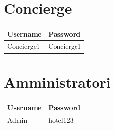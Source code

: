 \documentclass [a4paper, 12pt]{book}
\begin{document}
\section{Concierge}
\begin{table}[h]
\centering
\begin{tabular}{|l|l|}
\hline
\textbf{Username} & \textbf{Password}\\
\hline
Concierge1 & Concierge1\\
\hline
\end{tabular}

\end{table}\newpage

\section{Amministratori}
\begin{table}[h]
\centering
\begin{tabular}{|l|l|}
\hline
\textbf{Username} & \textbf{Password}\\
\hline
Admin & hotel123\\
\hline
\end{tabular}

\end{table}
\end{document}

